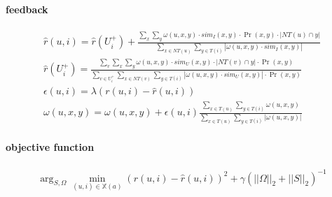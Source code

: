 \paragraph{feedback}
\begin{gather}
    \hat{r}(u,i)=\hat{r}(U_{i}^{+}) + \frac{\sum_{x}\sum_{y}\omega(u,x,y) \cdot sim_{I}(x,y) \cdot \Pr(x,y) \cdot |NT(u) \cap y|}{\sum_{x \in NT(u)} \sum_{y \in T(i)} |\omega(u,x,y) \cdot sim_{I}(x,y)|} \\
    \hat{r}(U_{i}^{+})
        =\frac{\sum_{v} \sum_{x} \sum_{y}\omega(u,x,y) \cdot sim_{U}(x,y) \cdot |NT(v) \cap y| \cdot \Pr(x,y)}
        {\sum_{v \in U_{i}^{+}} \sum_{x \in NT(v)} \sum_{y \in T(i)} |\omega(u,x,y) \cdot sim_{U}(x,y)|\cdot \Pr(x,y)} \\
    \epsilon(u,i) = \lambda \left(r(u,i) - \hat{r}(u,i)\right) \\
    \omega(u,x,y)=\omega(u,x,y)+\epsilon (u,i)\frac{\sum_{x \in T(u)}\sum_{y \in T(i)}\omega(u,x,y)}{\sum_{x \in T(u)}\sum_{y \in T(i)} |\omega(u,x,y)|}
\end{gather}

\paragraph{objective function}
\begin{gather}
    \arg_{S, \Omega} \min_{(u,i) \in \mathbb{X}(a)} \left(r(u,i) - \hat{r}(u,i) \right)^{2} + \gamma \left(||\Omega||_{2} +||S||_{2}\right)^{-1} \label{eq:obj_func}
\end{gather}